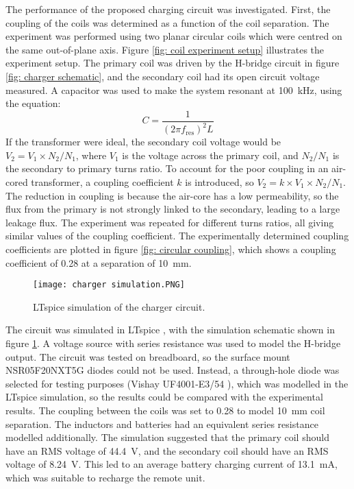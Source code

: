 The performance of the proposed charging circuit was investigated. First, the coupling of the coils was determined as a function of the coil separation. The experiment was performed using two planar circular coils which were centred on the same out-of-plane axis. Figure \ref{fig: coil experiment setup} illustrates the experiment setup. The primary coil was driven by the H-bridge circuit in figure \ref{fig: charger schematic}, and the secondary coil had its open circuit voltage measured. A capacitor was used to make the system resonant at \SI{100}{\kilo\hertz}, using the equation:
\begin{equation}
C = \frac{1}{(2\pi f_\text{res})^2L}
\end{equation}
If the transformer were ideal, the secondary coil voltage would be $V_2 = V_1 \times N_2 / N_1$, where $V_1$ is the voltage across the primary coil, and $N_2 / N_1$ is the secondary to primary turns ratio. To account for the poor coupling in an air-cored transformer, a coupling coefficient $k$ is introduced, so $V_2 = k \times V_1 \times N_2 / N_1$. The reduction in coupling is because the air-core has a low permeability, so the flux from the primary is not strongly linked to the secondary, leading to a large leakage flux. The experiment was repeated for different turns ratios, all giving similar values of the coupling coefficient. The experimentally determined coupling coefficients are plotted in figure \ref{fig: circular coupling}, which shows a coupling coefficient of 0.28 at a separation of \SI{10}{\milli\metre}.\\


\begin{figure}[htb]
	\centering
	\texttt{[image: charger simulation.PNG]}
	\caption{LTspice simulation of the charger circuit.}
	\label{fig: charger simulation}
\end{figure}

The circuit was simulated in LTspice \cite{ltspice}, with the simulation schematic shown in figure \ref{fig: charger simulation}. A voltage source with series resistance was used to model the H-bridge output. The circuit was tested on breadboard, so the surface mount NSR05F20NXT5G diodes could not be used. Instead, a through-hole diode was selected for testing purposes (Vishay UF4001-E3/54 \cite{tht_diode}), which was modelled in the LTspice simulation, so the results could be compared with the experimental results. The coupling between the coils was set to 0.28 to model \SI{10}{\milli\metre} coil separation. The inductors and batteries had an equivalent series resistance modelled additionally. The simulation suggested that the primary coil should have an RMS voltage of \SI{44.4}{\volt}, and the secondary coil should have an RMS voltage of \SI{8.24}{\volt}. This led to an average battery charging current of \SI{13.1}{\milli\ampere}, which was suitable to recharge the remote unit. \\

